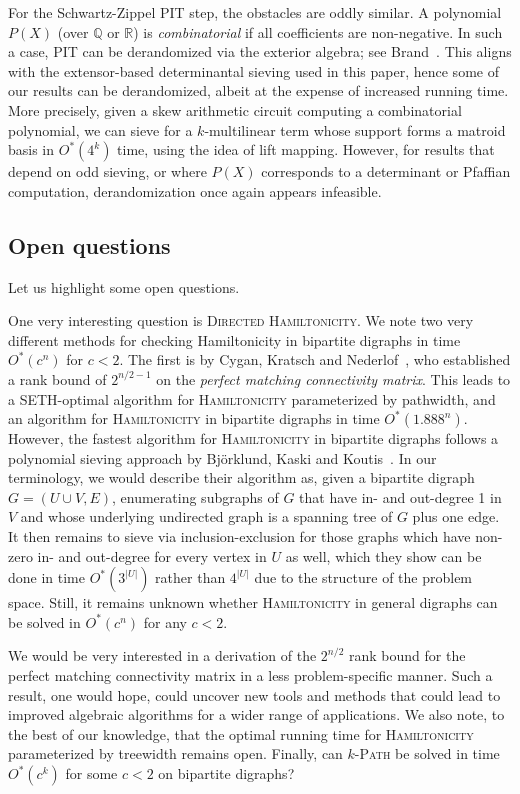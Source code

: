 \documentclass{theoretics}
\newcommand{\R}{\ensuremath{\mathbb R}\xspace}
\newcommand{\Q}{\ensuremath{\mathbb Q}\xspace}
\begin{document}
For the Schwartz-Zippel PIT step, the obstacles are oddly similar. 
A polynomial $P(X)$ (over $\Q$ or $\R$) is \emph{combinatorial} if all
coefficients are non-negative. In such a case, PIT can be derandomized
via the exterior algebra; see Brand~\cite{Brand19thesis}.
This aligns with the extensor-based determinantal sieving used
in this paper, hence some of our results can be derandomized, albeit at the expense of increased running time.
More precisely, given a skew arithmetic circuit computing a combinatorial polynomial, 
we can sieve for a $k$-multilinear term whose support forms a 
matroid basis in $O^*(4^k)$ time, using the idea of lift mapping.
However, for results that depend on odd sieving, or where $P(X)$
corresponds to a determinant or Pfaffian computation, 
derandomization once again appears infeasible.

\subsection{Open questions}

Let us highlight some open questions.

One very interesting question is \textsc{Directed Hamiltonicity}.
We note two very different methods for checking Hamiltonicity
in bipartite digraphs in time $O^*(c^n)$ for $c<2$. The first is by 
Cygan, Kratsch and Nederlof~\cite{CyganKN18hamilton}, who established
a rank bound of $2^{n/2-1}$ on the \emph{perfect matching connectivity matrix}. 
This leads to a SETH-optimal algorithm for \textsc{Hamiltonicity}
parameterized by pathwidth, and an algorithm for
\textsc{Hamiltonicity} in bipartite digraphs in time $O^*(1.888^n)$.
However, the fastest algorithm for \textsc{Hamiltonicity} in bipartite
digraphs follows a polynomial sieving approach by Björklund, Kaski
and Koutis~\cite{BjorklundKK17directed}. In our terminology, we would
describe their algorithm as, given a bipartite digraph $G=(U \cup V,E)$,
enumerating subgraphs of $G$ that have in- and out-degree 1 in $V$
and whose underlying undirected graph is a spanning tree of $G$
plus one edge. It then remains to sieve via inclusion-exclusion for
those graphs which have non-zero in- and out-degree for every vertex
in $U$ as well, which they show can be done in time $O^*(3^{|U|})$ 
rather than $4^{|U|}$ due to the structure of the problem space.
Still, it remains unknown whether \textsc{Hamiltonicity} in general
digraphs can be solved in $O^*(c^n)$ for any $c<2$.

We would be very interested in a derivation of the $2^{n/2}$
rank bound for the perfect matching connectivity matrix
in a less problem-specific manner. Such a result, one would hope,
could uncover new tools and methods that could lead to improved
algebraic algorithms for a wider range of applications.
We also note, to the best of our
knowledge, that the optimal running time for \textsc{Hamiltonicity}
parameterized by treewidth remains open. Finally, can
\textsc{$k$-Path} be solved in time $O^*(c^k)$ for some $c<2$
on bipartite digraphs? 
\end{document}
